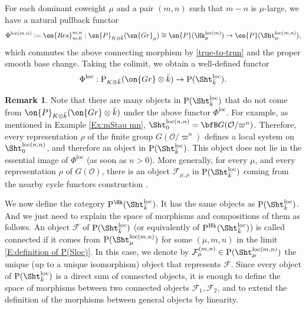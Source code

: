 \documentclass[11pt]{amsart}
\theoremstyle{definition}
\theoremstyle{definition}
\newtheorem{rmk}[thm]{Remark}
\theoremstyle{definition}
\numberwithin{equation}{subsection}
\def\calF{\mathcal{F}}
\newcommand{\mF}{{\mathcal F}}
\newcommand{\mO}{{\mathcal O}}
\newcommand{\Gr}{{\on{Gr}}}
\newcommand{\Res}{{\on{Res}}}
\newcommand{\loc}{\mathrm{loc}}
\newcommand{\rmP}{\mathrm{P}}
\begin{document}
For each dominant coweight $\mu$ and a pair $(m,n)$ such that $m-n$ is $\mu$-large, we have a natural pullback functor
\begin{equation*}
\label{E:functor P(Hk) to P(S)fin}
\Phi^{\loc(m,n)}:=\Res^{m,n}_{m,0}: \on{P}_{K\otimes \bar k}(\Gr_\mu)\cong \on{P}(\Hk_\mu^{\loc(m)})\to \on{P}(\Sht_\mu^{\loc(m,n)}),
\end{equation*}
which commutes the above connecting morphism by \eqref{true-to-trun} and the proper smooth base change. 
Taking the colimit, we obtain a well-defined functor
\begin{equation}
\label{E:functor P(Hk) to P(S)}
\Phi^{\loc}: \mathrm{P}_{K\otimes\bar k}(\Gr\otimes\bar k) \to \mathrm{P}(\Sht_{\bar k}^\loc).
\end{equation}

\begin{rmk}
\label{R: more object}
Note that there are many objects in $\mathrm{P}(\Sht_{\bar k}^\loc)$ that do not come from $\on{P}_{K\otimes \bar k}(\Gr\otimes\bar k)$ under the above functor $\Phi^{\loc}$. For example, as mentioned in Example \ref{Ex:mStau mn}, $\Sht^{\loc(n,n)}_0=\bfB G(\mO/\varpi^n)$. Therefore, every representation $\rho$ of the finite group $G(\mO/\varpi^n)$ defines a local system on $\Sht^{\loc(n,n)}_0$, and therefore an object  in $\mathrm{P}(\Sht_{\bar k}^\loc)$. This object does not lie in the essential image of $\Phi^\loc$ (as soon as $n>0$). More generally, for every $\mu$, and every representation $\rho$ of $G(\mO)$, there is an object $\mF_{\mu,\rho}$ in $\mathrm{P}(\Sht_{\bar k}^\loc)$ coming from the nearby cycle functors construction \cite{GL}. 
\end{rmk}





We now define the category $\rmP^{\Hk}(\Sht^\loc_{\bar k})$. It has the same objects as $\rmP(\Sht_{\bar k}^\loc)$. And we just need to explain the space of morphisms and compositions of them as follows.
An object $\mF$ of $\rmP(\Sht_{\bar k}^\loc)$ (or equivalently of $\rmP^\mathrm{Hk}(\Sht^\loc_{\bar k})$) is called connected if it comes from $\rmP(\Sht_\mu^{\loc(m,n)})$ for some $(\mu,m, n)$ in the limit \eqref{E:definition of P(Sloc)}. In this case, we denote by $\mF_\mu^{(m,n)}\in \rmP(\Sht_\mu^{\loc(m,n)})$ the unique (up to a unique isomorphism) object that represents $\mF$. Since every object of $\rmP(\Sht_{\bar k}^\loc)$ is a direct sum of connected objects, it is enough to define the space  of morphisms between two connected objects $\calF_1, \calF_2$, and to extend the definition of the morphisms between general objects by linearity.
\end{document}
